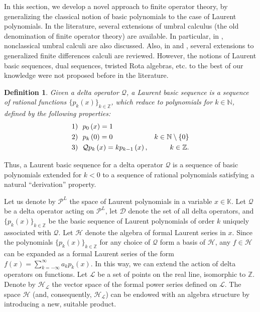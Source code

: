 \documentclass[10pt]{amsart}
\numberwithin{equation}{section}
\newtheorem{definition}{Definition}
\theoremstyle{definition}
\begin{document}
In this section, we develop a novel approach to finite operator theory,
by generalizing the classical notion of basic polynomials
\cite{Rota,Roman} to the case of Laurent polynomials. In the literature,
several extensions of umbral calculus (the old denomination of finite operator
theory) are available. In particular, in \cite{Roman}, nonclassical umbral
calculi are also discussed. Also, in \cite{LR1995} and \cite{BBN1986},
several extensions to generalized finite differences calculi are reviewed.
However, the notions of Laurent basic sequences, dual sequences, twisted
Rota algebras, etc. to the best of our knowledge were not proposed before
in the literature.
\begin{definition}
\label{defn2}
Given a delta operator $\mathcal{Q}$, a Laurent basic sequence is a sequence
of rational functions $\{p_{k}(x)\}_{k\in \mathbb{Z}}$, which reduce to
polynomials for $k\in \mathbb{N}$, defined by the following properties:
\begin{align}
& 1)\text{ \ }p_{0}\left ( x\right ) =1
\notag
\\
& 2)\text{ \ }p_{k}\left ( 0\right ) =0 & k\in \mathbb{N}\setminus \{0
\}
\nonumber
\\
& 3)\text{ \ }\mathcal{Q} p_{k}\left ( x\right ) =kp_{k-1}\left ( x
\right ), & k\in \mathbb{Z} .
\nonumber
\end{align}
\end{definition}
Thus, a Laurent basic sequence for a delta operator $\mathcal{Q}$ is a
sequence of basic polynomials extended for $k<0$ to a sequence of rational
polynomials satisfying a natural ``derivation'' property.

Let us denote by $\mathcal{P}^{L}$ the space of Laurent polynomials in
a variable $x\in \mathbb{K}$. Let $\mathcal Q$ be a delta operator acting
on $\mathcal{P}^{L}$, let $\mathcal{D}$ denote the set of all delta operators,
and $\{p_{k}(x)\}_{k\in \mathbb{Z}}$ be the basic sequence of Laurent polynomials
of order $k$ uniquely associated with $\mathcal{Q}$. Let
$\mathcal{H}$ denote the algebra of formal Laurent series in $x$. Since
the polynomials $\{p_{k}(x)\}_{k\in \mathbb{Z}}$ for any choice of
$\mathcal Q$ form a basis of $\mathcal{H}$, any $f\in \mathcal{H}$ can
be expanded as a formal Laurent series of the form
$ f(x)=\sum _{k=-\infty}^{\infty}a_{k} p_{k}(x)
\label{exp}
 $. In this way, we can extend the action of delta operators on functions.
Let $\mathcal{L}$ be a set of points on the real line, isomorphic to
$\mathbb{Z}$. Denote by $\mathcal{H_{L}}$ the vector space of the formal
power series defined on $\mathcal{L}$. The space $\mathcal{H}$ (and, consequently,
$\mathcal{H_{L}}$) can be endowed with an algebra structure by introducing
a new, suitable product.
\end{document}
